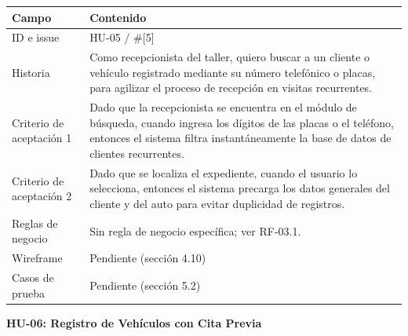 {\def\LTcaptype{none} %
\begin{longtable}[]{@{}
  >{\raggedright\arraybackslash}p{}
  >{\raggedright\arraybackslash}p{}@{}}
\toprule\noalign{}
\begin{minipage}[b]{\linewidth}\raggedright
\textbf{Campo}
\end{minipage} & \begin{minipage}[b]{\linewidth}\raggedright
\textbf{Contenido}
\end{minipage} \\
\midrule\noalign{}
\endhead
\bottomrule\noalign{}
\endlastfoot
ID e issue & HU-05 / \#{[}5{]} \\
Historia & Como recepcionista del taller, quiero buscar a un cliente o
vehículo registrado mediante su número telefónico o placas, para
agilizar el proceso de recepción en visitas recurrentes. \\
Criterio de aceptación 1 & Dado que la recepcionista se encuentra en el
módulo de búsqueda, cuando ingresa los dígitos de las placas o el
teléfono, entonces el sistema filtra instantáneamente la base de datos
de clientes recurrentes. \\
Criterio de aceptación 2 & Dado que se localiza el expediente, cuando el
usuario lo selecciona, entonces el sistema precarga los datos generales
del cliente y del auto para evitar duplicidad de registros. \\
Reglas de negocio & Sin regla de negocio específica; ver RF-03.1. \\
Wireframe & Pendiente (sección 4.10) \\
Casos de prueba & Pendiente (sección 5.2) \\
\end{longtable}
}

\textbf{HU-06: Registro de Vehículos con Cita Previa}

